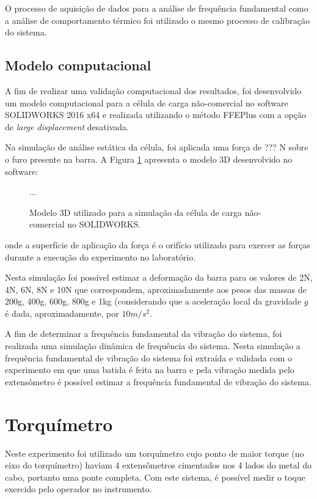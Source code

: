 \documentclass[a4paper]{instrumentacao}
\begin{document}
O processo de aquisição de dados para a análise de frequência fundamental como a análise de comportamento térmico foi utilizado o mesmo processo de calibração do sistema.

\subsection{Modelo computacional}
A fim de realizar uma validação computacional dos resultados, foi desenvolvido um modelo computacional para a célula de carga não-comercial no software SOLIDWORKS 2016 x64 e realizada utilizando o método FFEPlus com a opção de \textit{large displacement} desativada.

Na simulação de análise estática da célula, foi aplicada uma força de ??? N  sobre o furo presente na barra. A Figura \ref{fig:celula-nao-comercial-solid-modelo} apresenta o modelo 3D desenvolvido no software:

\begin{figure}[H]
\center
...
\caption{Modelo 3D utilizado para a simulação da célula de carga não-comercial no SOLIDWORKS.}
\label{fig:celula-nao-comercial-solid-modelo}
\end{figure}

\noindent onde a superfície de aplicação da força é o orifício utilizado para exercer as forças durante a execução do experimento no laboratório.

Nesta simulação foi possível estimar a deformação da barra para os valores de 2N, 4N, 6N, 8N e 10N que correspondem, aproximadamente aos pesos das massas de 200g, 400g, 600g, 800g e 1kg (considerando que a aceleração local da gravidade $g$ é dada, aproximadamente, por $10 m/s^2$.

A fim de determinar a frequência fundamental da vibração do sistema, foi realizada uma simulação dinâmica de frequência do sistema. Nesta simulação a frequência fundamental de vibração do sistema foi extraída e validada com o experimento em que uma batida é feita na barra e pela vibração medida pelo extensômetro é possível estimar a frequência fundamental de vibração do sistema.

\section{Torquímetro}
Neste experimento foi utilizado um torquímetro cujo ponto de maior torque (no eixo do torquímetro) haviam 4 extensômetros cimentados nos 4 lados do metal do cabo, portanto uma ponte completa. Com este sistema, é possível medir o toque exercido pelo operador no instrumento.
\end{document}
